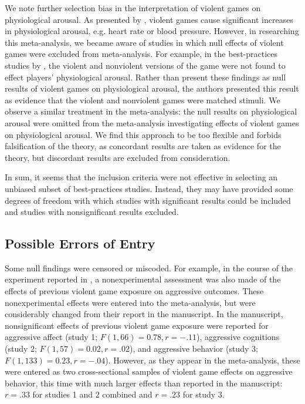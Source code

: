 \documentclass[man]{apa6}
\begin{document}
We note further selection bias in the interpretation of violent games on physiological arousal. As presented by \citet{Anderson:etal:2010}, violent games cause significant increases in physiological arousal, e.g. heart rate or blood pressure. However, in researching this meta-analysis, we became aware of studies in which null effects of violent games were excluded from meta-analysis. For example, in the best-practices studies by \citet{Carnagey:Anderson:2005}, the violent and nonviolent versions of the game were not found to effect players' physiological arousal. Rather than present these findings as null results of violent games on physiological arousal, the authors presented this result as evidence that the violent and nonviolent games were matched stimuli. We observe a similar treatment in the meta-analysis: the null results on physiological arousal were omitted from the meta-analysis investigating effects of violent games on physiological arousal. We find this approach to be too flexible and forbids falsification of the theory, as concordant results are taken as evidence for the theory, but discordant results are excluded from consideration.

In sum, it seems that the inclusion criteria were not effective in selecting an unbiased subset of best-practices studies. Instead, they may have provided some degrees of freedom with which studies with significant results could be included and studies with nonsignificant results excluded. %

\subsection{Possible Errors of Entry}
Some null findings were censored or miscoded. %
For example, in the course of the experiment reported in \citet{Carnagey:Anderson:2005}, a nonexperimental assessment was also made of the effects of previous violent game exposure on aggressive outcomes. These nonexperimental effects were entered into the \citet{Anderson:etal:2010} meta-analysis, but were considerably changed from their report in the \citet{Carnagey:Anderson:2005} manuscript.  In the manuscript, nonsignificant effects of previous violent game exposure were reported for aggressive affect (study 1; $F(1, 66) = 0.78, r = -.11$), aggressive cognitions (study 2; $F(1, 57) = 0.02, r = .02$), and aggressive behavior (study 3; $F(1, 133) = 0.23, r = -.04$). However, as they appear in the meta-analysis, these were entered as two cross-sectional samples of violent game effects on aggressive behavior, this time with much larger effects than reported in the manuscript: $r = .33$ for studies 1 and 2 combined and $r = .23$ for study 3.
\end{document}
